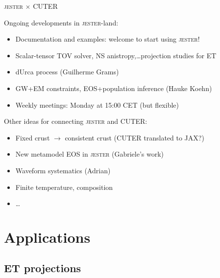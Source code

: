 \documentclass[usenames,dvipsnames,t]{beamer}
\begin{document}
\begin{frame}{\textsc{jester} $\times$ CUTER}
  \def\x{3mm}
  \def\y{1mm}

  Ongoing developments in \textsc{jester}-land:
  \begin{itemize}
    \vspace{\y}
    \item Documentation and examples: welcome to start using \textsc{jester}!
    \vspace{\y}
    \item Scalar-tensor TOV solver, NS anistropy,\dots projection studies for ET
    \vspace{\y}
    \item dUrca process (Guilherme Grams)
    \vspace{\y}
    \item GW+EM constraints, EOS+population inference (Hauke Koehn)
    \vspace{\y}
    \item Weekly meetings: Monday at 15:00 CET (but flexible)
  \end{itemize}

  Other ideas for connecting \textsc{jester} and CUTER:
  \begin{itemize}
    \vspace{\y}
    \item Fixed crust $\rightarrow$ consistent crust (CUTER translated to JAX?)
    \vspace{\y}
    \item New metamodel EOS in \textsc{jester} (Gabriele's work)
    \vspace{\y}
    \item Waveform systematics (Adrian)
    \vspace{\y}
    \item Finite temperature, composition
    \vspace{\y}
    \item \dots
  \end{itemize}

\end{frame}


\section{Applications}

\subsection{ET projections}
\end{document}
